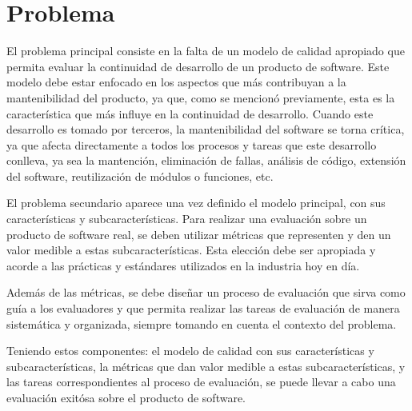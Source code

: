 \chapter{Problema}
\label{chap:problema}
El problema principal consiste en la falta de un modelo de calidad apropiado
que permita evaluar la continuidad de desarrollo de un producto de software.
Este modelo debe estar enfocado en los aspectos que más contribuyan a la mantenibilidad
del producto, ya que, como se mencionó previamente, esta es la característica que más
influye en la continuidad de desarrollo.
Cuando este desarrollo es tomado por terceros, la mantenibilidad
del software se torna crítica, ya que afecta directamente a todos los procesos y tareas
que este desarrollo conlleva, ya sea la mantención, eliminación de fallas, análisis de código,
extensión del software, reutilización de módulos o funciones, etc.

El problema secundario aparece una vez definido el modelo principal, con sus características
y subcaracterísticas. Para realizar una evaluación sobre un producto de software real, se deben
utilizar métricas que representen y den un valor medible a estas subcaracterísticas.
Esta elección debe ser apropiada y acorde a las prácticas y estándares utilizados en la industria
hoy en día.

Además de las métricas, se debe diseñar un proceso de evaluación que sirva como guía a los
evaluadores y que permita realizar las tareas de evaluación de manera sistemática y organizada, 
siempre tomando en cuenta el contexto del problema. 

Teniendo estos componentes: el modelo de calidad con sus características y subcaracterísticas,
la métricas que dan valor medible a estas subcaracterísticas, y las tareas correspondientes al proceso de evaluación, 
se puede llevar a cabo una evaluación exitósa sobre el producto de software.
